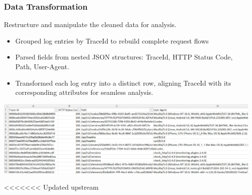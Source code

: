 \documentclass[10pt, a4paper]{beamer}
\begin{document}
	
	\begin{frame}
		\frametitle{Data Transformation}
		\begin{block}{}
			Restructure and manipulate the cleaned data for analysis.
			\begin{itemize}
				\item Grouped log entries by TraceId to rebuild complete request flows
				\item Parsed fields from nested JSON structures: TraceId, HTTP Status Code, Path, User-Agent.
				\item Transformed each log entry into a distinct row, aligning TraceId with its corresponding attributes for seamless analysis.
			\end{itemize}
		\end{block}
		
		\vfill
		
		\centering
		\includegraphics[width=1\textwidth]{images/DataTransformation.png} %
		
		\vskip 0.1cm %
		\centering
<<<<<<< Updated upstream
	\end{frame}
	
\end{document}
